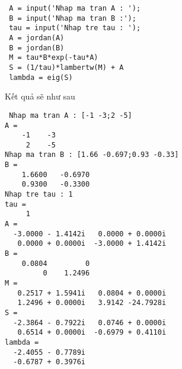  \begin{verbatim}
 A = input('Nhap ma tran A : ');
 B = input('Nhap ma tran B :');
 tau = input('Nhap tre tau : ');
 A = jordan(A)
 B = jordan(B)
 M = tau*B*exp(-tau*A)
 S = (1/tau)*lambertw(M) + A
 lambda = eig(S)
 \end{verbatim}
 Kết quả sẽ như sau 
 \begin{verbatim}
 Nhap ma tran A : [-1 -3;2 -5]
A =
    -1    -3
     2    -5
Nhap ma tran B : [1.66 -0.697;0.93 -0.33]
B =
    1.6600   -0.6970
    0.9300   -0.3300
Nhap tre tau : 1
tau =
     1
A =
  -3.0000 - 1.4142i   0.0000 + 0.0000i
   0.0000 + 0.0000i  -3.0000 + 1.4142i
B =
    0.0804         0
         0    1.2496
M =
   0.2517 + 1.5941i   0.0804 + 0.0000i
   1.2496 + 0.0000i   3.9142 -24.7928i
S =
  -2.3864 - 0.7922i   0.0746 + 0.0000i
   0.6514 + 0.0000i  -0.6979 + 0.4110i
lambda =
  -2.4055 - 0.7789i
  -0.6787 + 0.3976i
 \end{verbatim}
